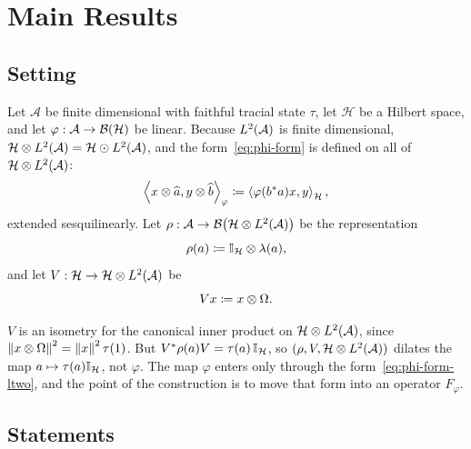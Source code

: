 \documentclass[12pt]{article}
\newcommand{\alg}{\mathcal{A}}             %
\newcommand{\hilb}{\mathcal{H}}            %
\newcommand{\bdd}[1]{\mathcal{B}\br{#1}}   %
\newcommand{\algtensor}{\odot}             %
\newcommand{\ip}[2]{\left\langle #1 , #2 \right\rangle}
\newcommand{\ipphi}[2]{\left\langle #1 , #2 \right\rangle_{\varphi}}
\newcommand{\Ltwo}{L^2\br{\alg}}           %
\newcommand{\vect}[1]{\widehat{#1}}        %
\newcommand{\Ltn}{\hilb \tensor \Ltwo}     %
\newcommand{\Fphi}{F_{\varphi}}            %
\begin{document}
\section{Main Results}
\label{sec:main-results}

\subsection{Setting}
\label{sec:setting}

Let \(\alg\) be finite dimensional with faithful tracial state \(\tau\), let
\(\hilb\) be a Hilbert space, and let \(\varphi : \alg \to \bdd{\hilb}\) be linear.
Because \(\Ltwo\) is finite dimensional, \(\Ltn = \hilb \algtensor \Ltwo\), and
the form~\eqref{eq:phi-form} is defined on all of \(\Ltn\):
\begin{equation}
\label{eq:phi-form-ltwo}
  \ipphi{x \tensor \vect{a}}{y \tensor \vect{b}}
  \eqdef \ip{\varphi(b^\adjoint a) x}{y}_{\hilb},
\end{equation}
extended sesquilinearly. Let \(\rho : \alg \to \bdd{\Ltn}\) be the representation
\[
  \rho(a) \eqdef \id_{\hilb} \tensor \lambda(a),
\]
and let \(V : \hilb \to \Ltn\) be
\[
  V x \coloneqq x \otimes \Omega .
\]

\begin{remark}
\label{rem:v-alone}
\(V\) is an isometry for the canonical inner product on \(\Ltn\), since
\(\left\| x \otimes \Omega \right\|^2 = \left\| x \right\|^2 \tau(1)\). But
\(V^\adjoint \rho(a) V = \tau(a)\,\id_{\hilb}\), so \((\rho, V, \Ltn)\) dilates the
map \(a \mapsto \tau(a)\id_{\hilb}\), not \(\varphi\). The map \(\varphi\) enters
only through the form~\eqref{eq:phi-form-ltwo}, and the point of the construction
is to move that form into an operator \(\Fphi\).
\end{remark}

\subsection{Statements}
\label{sec:statements}
\end{document}
